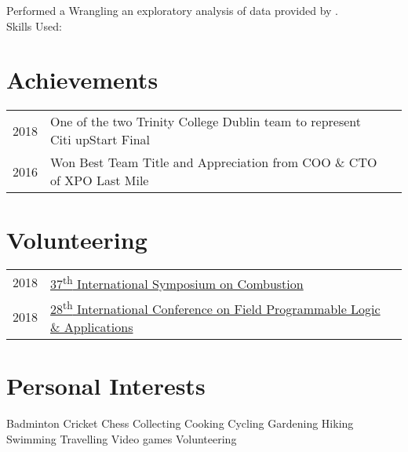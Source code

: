 \documentclass[]{aj-resume-openfont}
\begin{document}
\begin{minipage}[t]{0.66\textwidth}
Performed a Wrangling an exploratory analysis of data provided by \href{https://www.motivateco.com/}{}.\\
Skills Used:  
\sectionsep


\section{Achievements} 
\begin{tabular}{rll}
2018	 & One of the two Trinity College Dublin team to represent Citi upStart Final \\
2016     & Won Best Team Title and Appreciation from COO \& CTO of XPO Last Mile  \\
\end{tabular}


\section{Volunteering} 
\begin{tabular}{rll}
2018	 & \href{http://www.combustionsymposia.org/2018/home}{37\textsuperscript{th} International Symposium on Combustion} \\
2018     & \href{https://fpl2018.org/}{28\textsuperscript{th} International Conference on Field Programmable Logic \& Applications} \\
\end{tabular}


\section{Personal Interests} 

\textbullet{}Badminton \textbullet{}Cricket \textbullet{}Chess
\textbullet{}Collecting \textbullet{}Cooking \textbullet{}Cycling
\textbullet{}Gardening \textbullet{}Hiking \textbullet{}Swimming 
\textbullet{}Travelling \textbullet{}Video games \textbullet{}Volunteering 

\end{minipage} 
\end{document}
